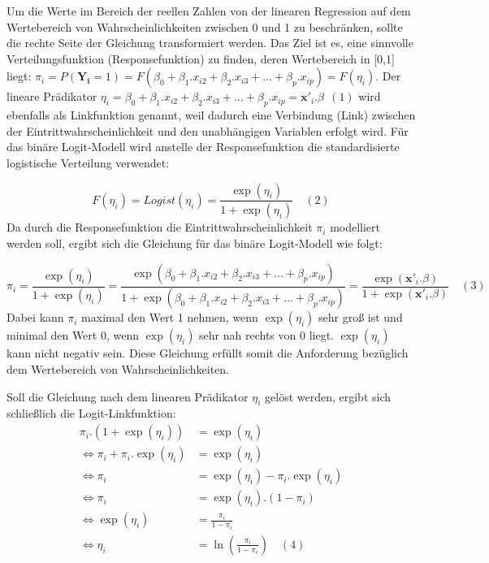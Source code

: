 \documentclass[12pt,]{article}
\begin{document}
Um die Werte im Bereich der reellen Zahlen von der linearen Regression
auf dem Wertebereich von Wahrscheinlichkeiten zwischen 0 und 1 zu
beschränken, sollte die rechte Seite der Gleichung transformiert werden.
Das Ziel ist es, eine sinnvolle Verteilungsfunktion (Responsefunktion)
zu finden, deren Wertebereich in {[}0,1{]} liegt:
\(\pi_i = P(\mathbf{Y_i} = 1) = F(\beta_0 + \beta_1.x_{i2} + \beta_2.x_{i3} + ... + \beta_p.x_{ip}) = F(\eta_i)\).
Der lineare Prädikator
\(\eta_i = \beta_0 + \beta_1.x_{i2} + \beta_2.x_{i3} + ... + \beta_p.x_{ip} = \mathbf{x'}_i.\beta \ \ (1)\)
wird ebenfalls als Linkfunktion genannt, weil dadurch eine Verbindung
(Link) zwischen der Eintrittwahrscheinlichkeit und den unabhängigen
Variablen erfolgt wird. Für das binäre Logit-Modell wird anstelle der
Responsefunktion die standardisierte logistische Verteilung verwendet:

\[
F(\eta_i) = Logist(\eta_i) = \frac{\exp(\eta_i)}{1 + \exp(\eta_i)} \quad (2)
\] Da durch die Responsefunktion die Eintrittwahrscheinlichkeit
\(\pi_i\) modelliert werden soll, ergibt sich die Gleichung für das
binäre Logit-Modell wie folgt:

\[
\pi_i = \frac{\exp(\eta_i)}{1 + \exp(\eta_i)} = \frac{\exp(\beta_0 + \beta_1.x_{i2} + \beta_2.x_{i3} + ... + \beta_p.x_{ip})}{1 + \exp(\beta_0 + \beta_1.x_{i2} + \beta_2.x_{i3} + ... + \beta_p.x_{ip})} = \frac{\exp(\mathbf{x'}_i.\beta)}{1+\exp(\mathbf{x'}_i.\beta)} \quad (3)
\] Dabei kann \(\pi_i\) maximal den Wert 1 nehmen, wenn \(\exp(\eta_i)\)
sehr groß ist und minimal den Wert 0, wenn \(\exp(\eta_i)\) sehr nah
rechts von 0 liegt. \(\exp(\eta_i)\) kann nicht negativ sein. Diese
Gleichung erfüllt somit die Anforderung bezüglich dem Wertebereich von
Wahrscheinlichkeiten.

Soll die Gleichung nach dem linearen Prädikator \(\eta_i\) gelöst
werden, ergibt sich schließlich die Logit-Linkfunktion: \[
\begin{aligned}
\pi_i.(1 + \exp(\eta_i)) &= \exp(\eta_i) \\
\Leftrightarrow \pi_i + \pi_i.\exp(\eta_i) &= \exp(\eta_i) \\
\Leftrightarrow \pi_i &= \exp(\eta_i) - \pi_i.\exp(\eta_i)  \\
\Leftrightarrow \pi_i &= \exp(\eta_i).(1-\pi_i) \\
\Leftrightarrow \exp(\eta_i) &= \frac{\pi_i}{1-\pi_i} \\
\Leftrightarrow \eta_i &= \ln(\frac{\pi_i}{1-\pi_i}) \quad (4)\\
\end{aligned} 
\]
\end{document}
